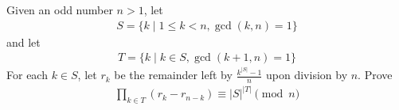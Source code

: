 Given an odd number $n >1$, let
\begin{align*} S =\{ k \mid 1 \le k < n , \gcd(k,n) =1 \} \end{align*}and let \begin{align*} T = \{ k \mid k \in S , \gcd(k+1,n) =1 \} \end{align*}For each $k \in S$, let $r_k$ be the remainder left by $\frac{k^{|S|}-1}{n}$ upon division by $n$. Prove
\begin{align*} \prod _{k \in T} \left( r_k - r_{n-k} \right) \equiv |S| ^{|T|} \pmod{n} \end{align*}